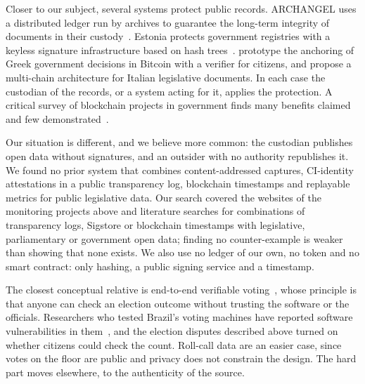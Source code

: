Closer to our subject, several systems protect public records. ARCHANGEL uses a distributed ledger run by archives to guarantee the long-term integrity of documents in their custody~\citep{collomosse2018archangel}. Estonia protects government registries with a keyless signature infrastructure based on hash trees~\citep{buldas2013ksi,eestonia-ksi}. \citet{beris2018modeling} prototype the anchoring of Greek government decisions in Bitcoin with a verifier for citizens, and \citet{arruzzoli2026multichain} propose a multi-chain architecture for Italian legislative documents. In each case the custodian of the records, or a system acting for it, applies the protection. A critical survey of blockchain projects in government finds many benefits claimed and few demonstrated~\citep{olnes2017blockchain}.

Our situation is different, and we believe more common: the custodian publishes open data without signatures, and an outsider with no authority republishes it. We found no prior system that combines content-addressed captures, CI-identity attestations in a public transparency log, blockchain timestamps and replayable metrics for public legislative data. Our search covered the websites of the monitoring projects above and literature searches for combinations of transparency logs, Sigstore or blockchain timestamps with legislative, parliamentary or government open data; finding no counter-example is weaker than showing that none exists. We also use no ledger of our own, no token and no smart contract: only hashing, a public signing service and a timestamp.

The closest conceptual relative is end-to-end verifiable voting~\citep{benaloh2015e2e}, whose principle is that anyone can check an election outcome without trusting the software or the officials. Researchers who tested Brazil's voting machines have reported software vulnerabilities in them~\citep{aranha2019return}, and the election disputes described above turned on whether citizens could check the count. Roll-call data are an easier case, since votes on the floor are public and privacy does not constrain the design. The hard part moves elsewhere, to the authenticity of the source.
